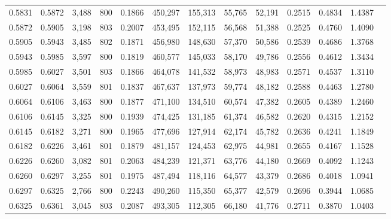 \begin{tabular}{rrrrrrrrrrrrr}
0.5831 & 0.5872 &  3,488 & 800 &                                     0.1866 & 450,297 & 155,313 &  55,765 &  52,191 & 0.2515 & 0.4834 & 1.4387 \\
0.5872 & 0.5905 &  3,198 & 803 &                                     0.2007 & 453,495 & 152,115 &  56,568 &  51,388 & 0.2525 & 0.4760 & 1.4090 \\
0.5905 & 0.5943 &  3,485 & 802 &                                     0.1871 & 456,980 & 148,630 &  57,370 &  50,586 & 0.2539 & 0.4686 & 1.3768 \\
0.5943 & 0.5985 &  3,597 & 800 &                                     0.1819 & 460,577 & 145,033 &  58,170 &  49,786 & 0.2556 & 0.4612 & 1.3434 \\
0.5985 & 0.6027 &  3,501 & 803 &                                     0.1866 & 464,078 & 141,532 &  58,973 &  48,983 & 0.2571 & 0.4537 & 1.3110 \\
0.6027 & 0.6064 &  3,559 & 801 &                                     0.1837 & 467,637 & 137,973 &  59,774 &  48,182 & 0.2588 & 0.4463 & 1.2780 \\
0.6064 & 0.6106 &  3,463 & 800 &                                     0.1877 & 471,100 & 134,510 &  60,574 &  47,382 & 0.2605 & 0.4389 & 1.2460 \\
0.6106 & 0.6145 &  3,325 & 800 &                                     0.1939 & 474,425 & 131,185 &  61,374 &  46,582 & 0.2620 & 0.4315 & 1.2152 \\
0.6145 & 0.6182 &  3,271 & 800 &                                     0.1965 & 477,696 & 127,914 &  62,174 &  45,782 & 0.2636 & 0.4241 & 1.1849 \\
0.6182 & 0.6226 &  3,461 & 801 &                                     0.1879 & 481,157 & 124,453 &  62,975 &  44,981 & 0.2655 & 0.4167 & 1.1528 \\
0.6226 & 0.6260 &  3,082 & 801 &                                     0.2063 & 484,239 & 121,371 &  63,776 &  44,180 & 0.2669 & 0.4092 & 1.1243 \\
0.6260 & 0.6297 &  3,255 & 801 &                                     0.1975 & 487,494 & 118,116 &  64,577 &  43,379 & 0.2686 & 0.4018 & 1.0941 \\
0.6297 & 0.6325 &  2,766 & 800 &                                     0.2243 & 490,260 & 115,350 &  65,377 &  42,579 & 0.2696 & 0.3944 & 1.0685 \\
0.6325 & 0.6361 &  3,045 & 803 &                                     0.2087 & 493,305 & 112,305 &  66,180 &  41,776 & 0.2711 & 0.3870 & 1.0403 \\

\end{tabular}
